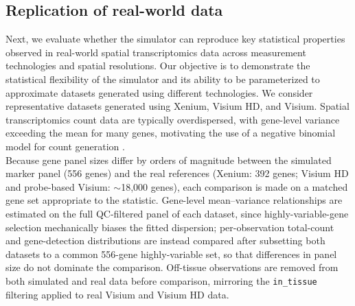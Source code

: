 
\subsection{Replication of real-world data}
Next, we evaluate whether the simulator can reproduce key statistical properties observed in real-world spatial transcriptomics data across measurement technologies and spatial resolutions. Our objective is to demonstrate the statistical flexibility of the simulator and its ability to be parameterized to approximate datasets generated using different technologies. We consider representative datasets generated using Xenium, Visium HD, and Visium. Spatial transcriptomics count data are typically overdispersed, with gene-level variance exceeding the mean for many genes, motivating the use of a negative binomial model for count generation \cite{zhao_modeling_2022} \cite{malsot_striping_2026} \cite{jones_cell_2025}. \\

Because gene panel sizes differ by orders of magnitude between the simulated marker panel (556 genes) and the real references (Xenium: 392 genes; Visium HD and probe-based Visium: $\sim$18{,}000 genes), each comparison is made on a matched gene set appropriate to the statistic. Gene-level mean--variance relationships are estimated on the full QC-filtered panel of each dataset, since highly-variable-gene selection mechanically biases the fitted dispersion; per-observation total-count and gene-detection distributions are instead compared after subsetting both datasets to a common 556-gene highly-variable set, so that differences in panel size do not dominate the comparison. Off-tissue observations are removed from both simulated and real data before comparison, mirroring the \texttt{in\_tissue} filtering applied to real Visium and Visium HD data. \\

